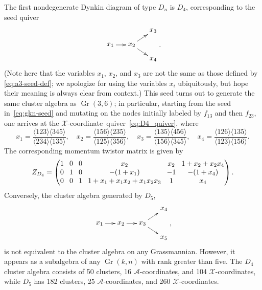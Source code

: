 \documentclass[12pt]{article}
\DeclareMathOperator{\Gr}{Gr}
\def\ket#1{\langle #1 \rangle}
\def\xcoord{$\mathcal{X}$-coordinate}
\def\xcoords{$\mathcal{X}$-coordinates}
\def\acoords{$\mathcal{A}$-coordinates}
\begin{document}
The first nondegenerate Dynkin diagram of type $D_n$ is $D_4$, corresponding to the seed quiver
\begin{equation} \label{eq:D4_quiver}
    \begin{gathered}
    \begin{xy} 0;<1pt,0pt>:<0pt,-1pt>::
      (0,20) *+{x_1} ="1",
      (30,20) *+{x_2} ="2",
      (60,0) *+{x_3} ="3",
      (60,40) *+{x_4} ="4",
      "1", {\ar"2"},
      "2", {\ar"3"},
      "2", {\ar"4"},
    \end{xy}
    \end{gathered} .
\end{equation}
(Note here that the variables $x_1$, $x_2$, and $x_3$ are not the same as those defined by \eqref{eq:a3-seed-def}; we apologize for using the variables $x_i$ ubiquitously, but hope their meaning is always clear from context.) This seed turns out to generate the same cluster algebra as $\Gr(3,6)$; in particular, starting from the seed in~\eqref{eq:gkn-seed} and mutating on the nodes initially labeled by $f_{13}$ and then $f_{23}$, one arrives at the \xcoord\ quiver~\eqref{eq:D4_quiver}, where
\begin{equation}\label{eq:d4-seed-def}
x_1 = \frac{\ket{123}\ket{345}}{\ket{234}\ket{135}}, \quad x_2 = \frac{\ket{156}\ket{235}}{\ket{125}\ket{356}}, \quad x_3 = \frac{\ket{135}\ket{456}}{\ket{156}\ket{345}}, \quad x_4 = \frac{\ket{126}\ket{135}}{\ket{123}\ket{156}}.
\end{equation}
The corresponding momentum twistor matrix is given by
\begin{equation}
Z_{D_4} = 
\begingroup
\setlength\arraycolsep{4pt}
\begin{pmatrix} 
 1 & 0 & 0 & x_2 & x_2 & 1+x_2+x_2 x_4 \\
 0 & 1 & 0 & -(1+x_1) & -1 & - (1+x_4) \\
 0 & 0 & 1 & 1 + x_1 + x_1 x_2 + x_1 x_2 x_3 & 1 & x_4
 \end{pmatrix}
\endgroup .
\end{equation}
Conversely, the cluster algebra generated by $D_5$,
\begin{equation}\label{def:D5}
    \begin{gathered}
    \begin{xy} 0;<1pt,0pt>:<0pt,-1pt>::
      (0,20) *+{x_1} ="1",
      (30,20) *+{x_2} ="2",
      (60,20) *+{x_3} ="3",
      (90,0) *+{x_4} ="4",
      (90,40) *+{x_5} ="5",
      "1", {\ar"2"},
      "2", {\ar"3"},
      "3", {\ar"4"},
      "3", {\ar"5"},
    \end{xy}
    \end{gathered} ,
\end{equation}
is not equivalent to the cluster algebra on any Grassmannian. However, it appears as a subalgebra of any $\Gr(k,n)$ with rank greater than five. The $D_4$ cluster algebra consists of 50 clusters, 16 \acoords, and 104 \xcoords, while $D_5$ has 182 clusters, 25 \acoords, and 260 \xcoords. 
\end{document}
